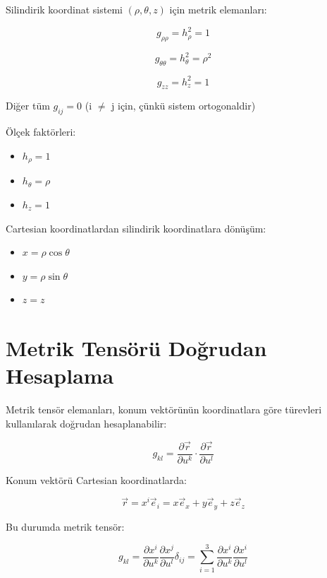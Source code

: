 \documentclass[11pt,letterpaper,twocolumn]{fenbil}
\begin{document}
Silindirik koordinat sistemi $(\rho, \theta, z)$ için metrik elemanları:

\begin{equation}
g_{\rho\rho} = h_\rho^2 = 1
\end{equation}

\begin{equation}
g_{\theta\theta} = h_\theta^2 = \rho^2
\end{equation}

\begin{equation}
g_{zz} = h_z^2 = 1
\end{equation}

Diğer tüm $g_{ij} = 0$ (i $\neq$ j için, çünkü sistem ortogonaldir)

Ölçek faktörleri:
\begin{itemize}
\item $h_\rho = 1$
\item $h_\theta = \rho$
\item $h_z = 1$
\end{itemize}

Cartesian koordinatlardan silindirik koordinatlara dönüşüm:
\begin{itemize}
\item $x = \rho \cos \theta$
\item $y = \rho \sin \theta$
\item $z = z$
\end{itemize}

\section{Metrik Tensörü Doğrudan Hesaplama}

Metrik tensör elemanları, konum vektörünün koordinatlara göre türevleri kullanılarak doğrudan hesaplanabilir:

\begin{equation}
g_{kl} = \frac{\partial \vec{r}}{\partial u^k} \cdot \frac{\partial \vec{r}}{\partial u^l}
\end{equation}

Konum vektörü Cartesian koordinatlarda:

\begin{equation}
\vec{r} = x^i \vec{e}_i = x\vec{e}_x + y\vec{e}_y + z\vec{e}_z
\end{equation}

Bu durumda metrik tensör:

\begin{equation}
g_{kl} = \frac{\partial x^i}{\partial u^k} \frac{\partial x^j}{\partial u^l} \delta_{ij} = \sum_{i=1}^3 \frac{\partial x^i}{\partial u^k} \frac{\partial x^i}{\partial u^l}
\end{equation}
\end{document}
